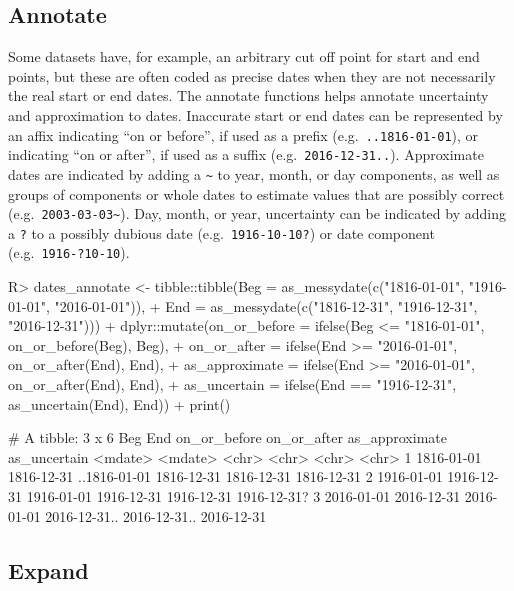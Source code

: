 \documentclass[
]{jss}
\begin{document}
\hypertarget{annotate}{%
\subsection{Annotate}\label{annotate}}

Some datasets have, for example, an arbitrary cut off point for start
and end points, but these are often coded as precise dates when they are
not necessarily the real start or end dates. The annotate functions
helps annotate uncertainty and approximation to dates. Inaccurate start
or end dates can be represented by an affix indicating ``on or before'',
if used as a prefix (e.g.~\texttt{..1816-01-01}), or indicating ``on or
after'', if used as a suffix (e.g.~\texttt{2016-12-31..}). Approximate
dates are indicated by adding a \texttt{\textasciitilde{}} to year,
month, or day components, as well as groups of components or whole dates
to estimate values that are possibly correct
(e.g.~\texttt{2003-03-03\textasciitilde{}}). Day, month, or year,
uncertainty can be indicated by adding a \texttt{?} to a possibly
dubious date (e.g.~\texttt{1916-10-10?}) or date component
(e.g.~\texttt{1916-?10-10}).

\begin{CodeChunk}
\begin{CodeInput}
R> dates_annotate <- tibble::tibble(Beg = as_messydate(c("1816-01-01", "1916-01-01", "2016-01-01")),
+                                  End = as_messydate(c("1816-12-31", "1916-12-31", "2016-12-31"))) %
+   dplyr::mutate(on_or_before = ifelse(Beg <= "1816-01-01", on_or_before(Beg), Beg),
+                 on_or_after = ifelse(End >= "2016-01-01", on_or_after(End), End),
+                 as_approximate = ifelse(End >= "2016-01-01", on_or_after(End), End),
+                 as_uncertain = ifelse(End == "1916-12-31", as_uncertain(End), End)) %
+   print()
\end{CodeInput}
\begin{CodeOutput}
# A tibble: 3 x 6
  Beg        End        on_or_before on_or_after  as_approximate as_uncertain
  <mdate>    <mdate>    <chr>        <chr>        <chr>          <chr>       
1 1816-01-01 1816-12-31 ..1816-01-01 1816-12-31   1816-12-31     1816-12-31  
2 1916-01-01 1916-12-31 1916-01-01   1916-12-31   1916-12-31     1916-12-31? 
3 2016-01-01 2016-12-31 2016-01-01   2016-12-31.. 2016-12-31..   2016-12-31  
\end{CodeOutput}
\end{CodeChunk}

\hypertarget{expand}{%
\subsection{Expand}\label{expand}}
\end{document}
